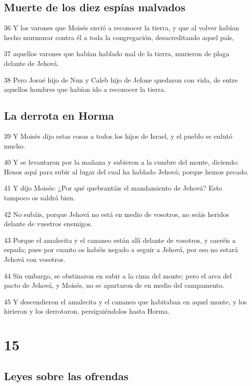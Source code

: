 \section*{Muerte de los diez espías malvados}

\par 36 Y los varones que Moisés envió a reconocer la tierra, y que al volver habían hecho murmurar contra él a toda la congregación, desacreditando aquel país,
\par 37 aquellos varones que habían hablado mal de la tierra, murieron de plaga delante de Jehová.
\par 38 Pero Josué hijo de Nun y Caleb hijo de Jefone quedaron con vida, de entre aquellos hombres que habían ido a reconocer la tierra.

\section*{La derrota en Horma }

\par 39 Y Moisés dijo estas cosas a todos los hijos de Israel, y el pueblo se enlutó mucho.
\par 40 Y se levantaron por la mañana y subieron a la cumbre del monte, diciendo: Henos aquí para subir al lugar del cual ha hablado Jehová; porque hemos pecado.
\par 41 Y dijo Moisés: ¿Por qué quebrantáis el mandamiento de Jehová? Esto tampoco os saldrá bien.
\par 42 No subáis, porque Jehová no está en medio de vosotros, no seáis heridos delante de vuestros enemigos.
\par 43 Porque el amalecita y el cananeo están allí delante de vosotros, y caeréis a espada; pues por cuanto os habéis negado a seguir a Jehová, por eso no estará Jehová con vosotros.
\par 44 Sin embargo, se obstinaron en subir a la cima del monte; pero el arca del pacto de Jehová, y Moisés, no se apartaron de en medio del campamento.
\par 45 Y descendieron el amalecita y el cananeo que habitaban en aquel monte, y los hirieron y los derrotaron, persiguiéndolos hasta Horma.

\chapter{15}

\section*{Leyes sobre las ofrendas}

